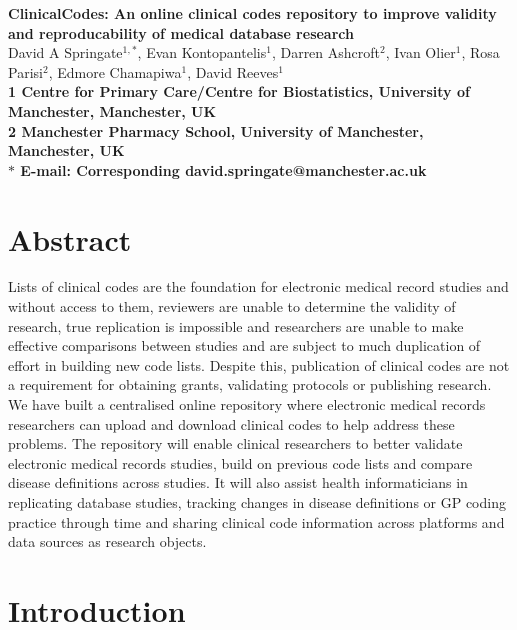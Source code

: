 \documentclass[10pt]{article}
\date{}
\begin{document}
\begin{flushleft}
{\Large
\textbf{ClinicalCodes: An online clinical codes repository to improve validity and reproducability of medical database research}
}
\\
David A Springate$^{1,\ast}$, 
Evan Kontopantelis$^{1}$,
Darren Ashcroft$^{2}$,
Ivan Olier$^{1}$,
Rosa Parisi$^{2}$,
Edmore Chamapiwa$^{1}$,
David Reeves$^{1}$
\\
\bf{1} Centre for Primary Care/Centre for Biostatistics, University of Manchester, Manchester, UK
\\
\bf{2} Manchester Pharmacy School, University of Manchester, Manchester, UK
\\
$\ast$ E-mail: Corresponding david.springate@manchester.ac.uk
\end{flushleft}

\section*{Abstract}

Lists of clinical codes are the foundation for electronic medical record studies and without access to them, reviewers are unable to determine the validity of research, true replication is impossible and researchers are unable to make effective comparisons between studies and are subject to much duplication of effort in building new code lists.  Despite this, publication of clinical codes are not a requirement for obtaining grants, validating protocols or publishing research.  We have built a centralised online repository where electronic medical records researchers can upload and download clinical codes to help address these problems.  The repository will enable clinical researchers to better validate electronic medical records studies, build on previous code lists and compare disease definitions across studies.  It will also assist health informaticians in replicating database studies, tracking changes in disease definitions or GP coding practice through time and sharing clinical code information across platforms and data sources as research objects. 

\section*{Introduction}
\end{document}
